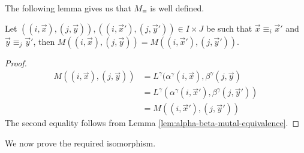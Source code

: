 \documentclass[../paper.tex]{subfiles}
\begin{document}
The following lemma gives us that $M_\equiv$ is well defined.

\begin{lem}
	Let $((i, \vec{x}), (j, \vec{y})), ((i, \vec{x}'), (j, \vec{y}')) \in I \times
  J$ be such that $\vec{x} \equiv_i \vec{x}'$ and $\vec{y} \equiv_j \vec{y}'$,
  then $M((i, \vec{x}), (j, \vec{y})) = M((i, \vec{x}'), (j, \vec{y}'))$.
	\label{lem:matrix-quot-well-defined}
\end{lem}
\begin{proof}
	\begin{align*}
		M((i, \vec{x}),(j, \vec{y})) & = L^{\gamma}(\alpha^{\gamma}(i, \vec{x}), \beta^{\gamma}(j, \vec{y})    \\
		                             & = L^{\gamma}(\alpha^{\gamma}(i, \vec{x}'), \beta^{\gamma}(j, \vec{y}')) \\
		                             & = M((i, \vec{x}'), (j, \vec{y}'))                                       
	\end{align*}
	The second equality follows from Lemma \ref{lem:alpha-beta-mutal-equivalence}.
\end{proof}

We now prove the  required isomorphism.
\end{document}
